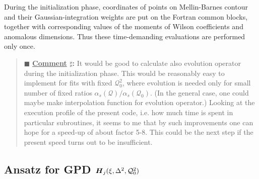 \documentclass[12pt]{article}
\newcounter{comment}
\newenvironment{commblock}%
{\refstepcounter{comment}%
\begin{quote}\renewcommand{\baselinestretch}{1}
\ttfamily\small$\blacksquare$ \textbf{\underline{Comment} $\sharp$\thecomment:}}%
{\end{quote}}
\begin{document}
During the initialization phase, coordinates of points on Mellin-Barnes contour and 
their Gaussian-integration weights
are put on the Fortran common blocks, together with corresponding values of
the moments of Wilson coefficients and anomalous dimensions. Thus these
time-demanding evaluations are performed only once.

\begin{commblock}
It would be good to calculate also evolution operator during the initialization phase.
This would be reasonably easy to implement for fits with fixed $\mathcal{Q}_{0}^2$, 
where evolution is needed only for small number of fixed ratios 
$\alpha_{s}(\mathcal{Q})/\alpha_{s}(\mathcal{Q}_0)$. (In the general case, one could
maybe make interpolation function for evolution operator.)
Looking at the execution profile of the present code, i.e. how much time is spent
in particular subroutines, it seems to me that by such improvements one can hope
for a speed-up of about factor 5-8. This could be the next step if the present
speed turns out to be insufficient.
\end{commblock}


\subsection{Ansatz for GPD $\mbox{\boldmath $H$}_{j} (\xi,\Delta^2,\mathcal{Q}_{0}^2)$}
\label{ssect:ansatz}
\end{document}
